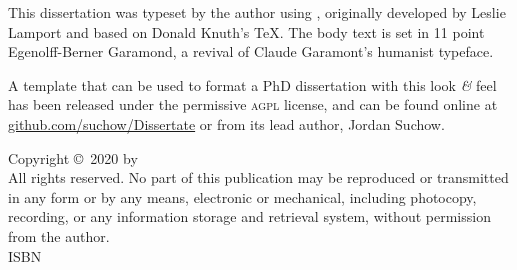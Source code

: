     \noindent This dissertation was typeset by the author using \LaTeXe,
    originally developed by Leslie Lamport and based on Donald Knuth's \TeX.
    The body text is set in 11 point Egenolff-Berner Garamond,
    a revival of Claude Garamont's humanist typeface.
    
    A template that can be used to format a PhD dissertation with this look
    \textit{\&} feel has been released under the permissive \textsc{agpl}
    license, and can be found online at \href{https://github.com/suchow/Dissertate}{github.com/suchow/Dissertate} or from its lead author, Jordan Suchow.%
    
	\vspace*{\fill}
	
	{
	\noindent Copyright \small \copyright\ \small 2020 \hspace{3pt} by \theauthor \\
	\noindent All rights reserved. No part of this publication may be reproduced or transmitted in any form or by any means, electronic or mechanical, including photocopy, recording, or any information storage and retrieval system, without permission from the author. \\
	\noindent ISBN
	}